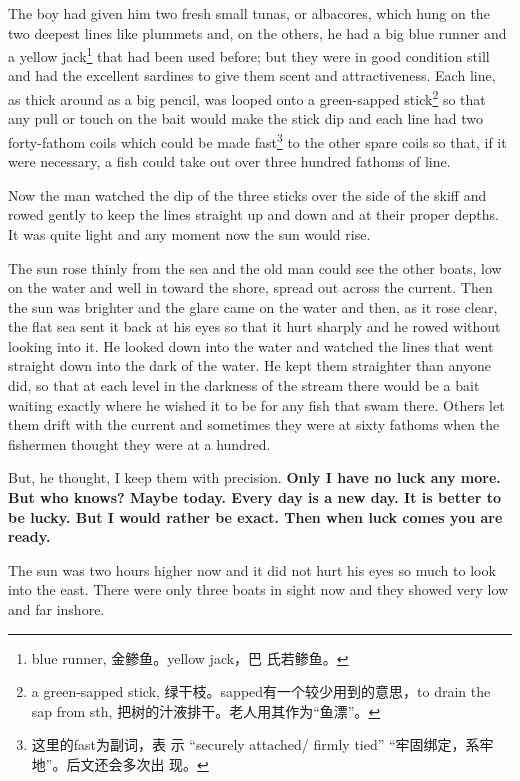 The boy had given him two fresh small tunas, or albacores, which hung on the
two deepest lines like \glspl{plummet} and, on the others, he had a big blue
\gls{runner} and a yellow jack\footnote{blue runner, 金鲹鱼。yellow jack，巴
  氏若鲹鱼。} that had been used before; but they were in good
\gls{condition} still and had the \gls{excellent} sardines to give them
\gls{scent} and \gls{attractiveness}. Each line, as \gls{thick} around as a
big pencil, was looped onto a green-sapped \gls{stick}\footnote{a
  green-sapped stick, 绿干枝。sapped有一个较少用到的意思，to drain the sap
  from sth, 把树的汁液排干。老人用其作为“鱼漂”。} so that any pull or
touch on the bait would make the stick dip and each line had two
forty-fathom coils which could be made fast\footnote{这里的fast为副词，表
  示 ``securely attached/ firmly tied'' “牢固绑定，系牢地”。后文还会多次出
  现。} to the other \gls{spare} coils so that, if it were necessary, a fish
could take out over three hundred fathoms of line.

Now the man watched the dip of the three sticks over the side of the skiff
and rowed gently to keep the lines \gls{straight} up and down and at their \gls{proper}
depths. It was quite light and any moment now the sun would rise.

The sun rose \gls{thinly} from the sea and the old man could see the other boats,
low on the water and well in \gls{toward} the \gls{shore}, spread out across the
current. Then the sun was brighter and the \gls{glare} came on the water and
then, as it rose clear, the \gls{flat} sea sent it back at his eyes so that it
hurt \gls{sharply} and he rowed without looking into it. He looked down into the
water and watched the lines that went straight down into the dark of the
water. He kept them straighter than anyone did, so that at each level in
the darkness of the stream there would be a bait waiting exactly where he
wished it to be for any fish that swam there. Others let them drift with
the current and sometimes they were at sixty fathoms when the fishermen
thought they were at a hundred.

But, he thought, I keep them with \gls{precision}.\textbf{ Only I have no
  luck any more. But who knows? Maybe today. Every day is a new day. It is
  better to be lucky. But I would rather be exact. Then when luck comes you
  are ready.}

The sun was two hours higher now and it did not hurt his eyes so much to
look into the east. There were only three boats in \gls{sight} now and they
showed very low and far \gls{inshore}.

